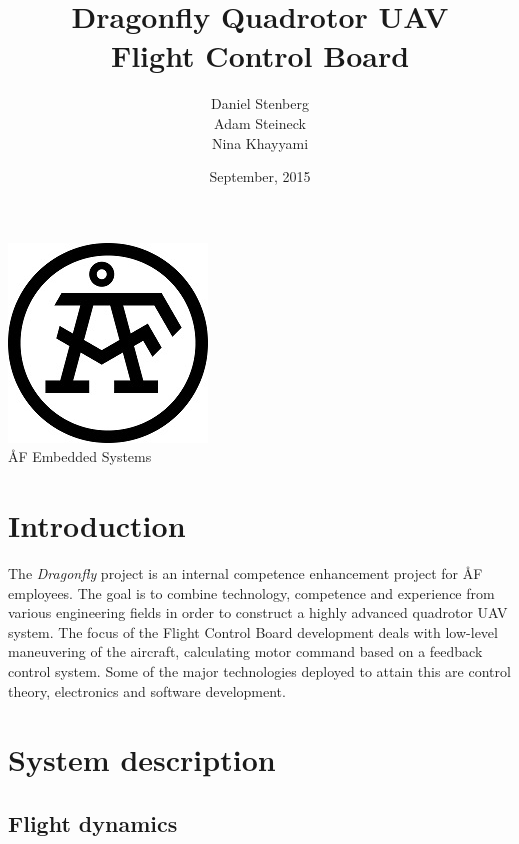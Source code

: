 \documentclass[a4paper]{article}
\title{Dragonfly Quadrotor UAV \\ Flight Control Board}
\author{Daniel Stenberg \\ Adam Steineck \\ Nina Khayyami}
\date{September, 2015}         		%
\begin{document}

\maketitle                      		%

\begin{center}   
\vspace{64pt}                  
\includegraphics[scale=1.6]{images/AF_Logotype20141_Black.png}
\vspace{16pt}
\\ \large ÅF Embedded Systems
\end{center}

\newpage

\tableofcontents				%

\newpage

\section{Introduction}

The \emph{Dragonfly} project is an internal competence enhancement project for ÅF employees. The goal is to combine technology, competence and experience from various engineering fields in order to construct a highly advanced quadrotor UAV system. The focus of the Flight Control Board development deals with low-level maneuvering of the aircraft, calculating motor command based on a feedback control system. Some of the major technologies deployed to attain this are control theory, electronics and software development.

\section{System description}

	\subsection{Flight dynamics}
	
\end{document}
